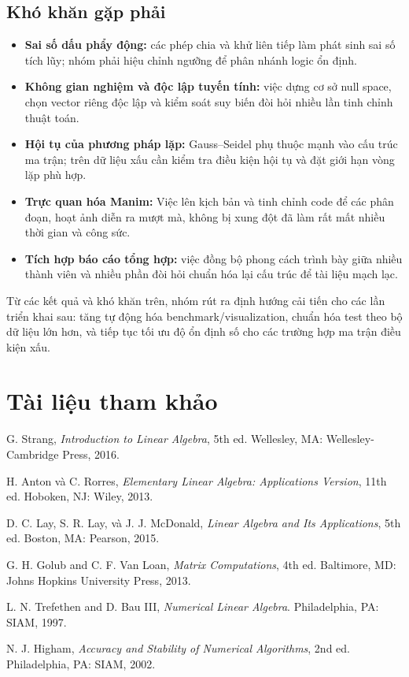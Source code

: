 \documentclass[a4paper]{article}
\begin{document}
\subsection{Khó khăn gặp phải}

\begin{itemize}
    \item \textbf{Sai số dấu phẩy động:} các phép chia và khử liên tiếp làm phát sinh sai số tích lũy; nhóm phải hiệu chỉnh ngưỡng để phân nhánh logic ổn định.
    \item \textbf{Không gian nghiệm và độc lập tuyến tính:} việc dựng cơ sở null space, chọn vector riêng độc lập và kiểm soát suy biến đòi hỏi nhiều lần tinh chỉnh thuật toán.
    \item \textbf{Hội tụ của phương pháp lặp:} Gauss--Seidel phụ thuộc mạnh vào cấu trúc ma trận; trên dữ liệu xấu cần kiểm tra điều kiện hội tụ và đặt giới hạn vòng lặp phù hợp.
    \item \textbf{Trực quan hóa Manim:} Việc lên kịch bản và tinh chỉnh code để các phân đoạn, hoạt ảnh diễn ra mượt mà, không bị xung đột đã làm rất mất nhiều thời gian và công sức.
    \item \textbf{Tích hợp báo cáo tổng hợp:} việc đồng bộ phong cách trình bày giữa nhiều thành viên và nhiều phần đòi hỏi chuẩn hóa lại cấu trúc để tài liệu mạch lạc.
\end{itemize}

Từ các kết quả và khó khăn trên, nhóm rút ra định hướng cải tiến cho các lần triển khai sau: tăng tự động hóa benchmark/visualization, chuẩn hóa test theo bộ dữ liệu lớn hơn, và tiếp tục tối ưu độ ổn định số cho các trường hợp ma trận điều kiện xấu.

\section*{Tài liệu tham khảo}

\begin{enumerate}[label={[\arabic*]}]
    \item G. Strang, \textit{Introduction to Linear Algebra}, 5th ed. Wellesley, MA: Wellesley-Cambridge Press, 2016.
    \item H. Anton và C. Rorres, \textit{Elementary Linear Algebra: Applications Version}, 11th ed. Hoboken, NJ: Wiley, 2013.
    \item D. C. Lay, S. R. Lay, và J. J. McDonald, \textit{Linear Algebra and Its Applications}, 5th ed. Boston, MA: Pearson, 2015.
    \item G. H. Golub and C. F. Van Loan, \textit{Matrix Computations}, 4th ed. Baltimore, MD: Johns Hopkins University Press, 2013.
    \item L. N. Trefethen and D. Bau III, \textit{Numerical Linear Algebra}. Philadelphia, PA: SIAM, 1997.
    \item N. J. Higham, \textit{Accuracy and Stability of Numerical Algorithms}, 2nd ed. Philadelphia, PA: SIAM, 2002.
\end{enumerate}
\end{document}
